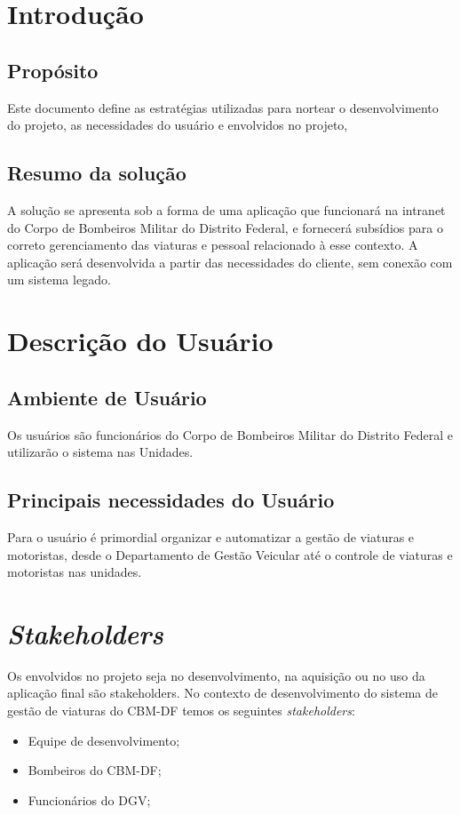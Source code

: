 \begin{apendicesenv}
	\section{Introdução}
		\subsection{Propósito}
Este documento define as estratégias utilizadas para nortear o desenvolvimento do projeto, as necessidades do usuário e envolvidos no projeto,
		\subsection{Resumo da solução}
A solução se apresenta sob a forma de uma aplicação que funcionará na intranet do Corpo de Bombeiros Militar do Distrito Federal, e fornecerá subsídios para o correto gerenciamento das viaturas e pessoal relacionado à esse contexto. A aplicação será desenvolvida a partir das necessidades do cliente, sem conexão com um sistema legado.
	\section{Descrição do Usuário}
		\subsection{Ambiente de Usuário}
Os usuários são funcionários do Corpo de Bombeiros Militar do Distrito Federal e utilizarão o sistema nas Unidades.
		\subsection{Principais necessidades do Usuário}
Para o usuário é primordial organizar e automatizar a gestão de viaturas e motoristas, desde o Departamento de Gestão Veicular até o controle de viaturas e motoristas nas unidades.
	\section{\textit{Stakeholders}}
Os envolvidos no projeto seja no desenvolvimento, na aquisição ou no uso da aplicação final são stakeholders. No contexto de desenvolvimento do sistema de gestão de viaturas do CBM-DF temos os seguintes \textit{stakeholders}:
\begin{itemize}
 \item Equipe de desenvolvimento;
 \item Bombeiros do CBM-DF;
 \item Funcionários do DGV;
\end{itemize}

\end{apendicesenv}
